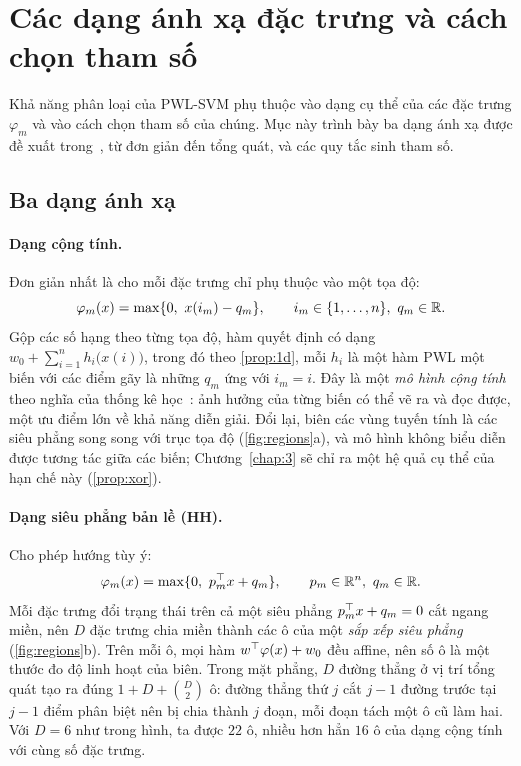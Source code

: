 \section{Các dạng ánh xạ đặc trưng và cách chọn tham số}\label{sec:maps}

Khả năng phân loại của PWL-SVM phụ thuộc vào dạng cụ thể của các đặc trưng $\varphi_m$ và vào cách chọn tham số của chúng. Mục này trình bày ba dạng ánh xạ được đề xuất trong~\cite{huang2013}, từ đơn giản đến tổng quát, và các quy tắc sinh tham số.

\subsection{Ba dạng ánh xạ}

\paragraph{Dạng cộng tính.} Đơn giản nhất là cho mỗi đặc trưng chỉ phụ thuộc vào một tọa độ:
\begin{equation}\label{eq:additive}
\varphi_m(x)=\max\{0,\ x(i_m)-q_m\},\qquad i_m\in\{1,\dots,n\},\ q_m\in\R .
\end{equation}
Gộp các số hạng theo từng tọa độ, hàm quyết định có dạng $w_0+\sum_{i=1}^{n}h_i\bigl(x(i)\bigr)$, trong đó theo \cref{prop:1d}, mỗi $h_i$ là một hàm PWL một biến với các điểm gãy là những $q_m$ ứng với $i_m=i$. Đây là một \emph{mô hình cộng tính} theo nghĩa của thống kê học~\cite{hastie1990}: ảnh hưởng của từng biến có thể vẽ ra và đọc được, một ưu điểm lớn về khả năng diễn giải. Đổi lại, biên các vùng tuyến tính là các siêu phẳng song song với trục tọa độ (\cref{fig:regions}a), và mô hình không biểu diễn được tương tác giữa các biến; Chương~\ref{chap:3} sẽ chỉ ra một hệ quả cụ thể của hạn chế này (\cref{prop:xor}).

\paragraph{Dạng siêu phẳng bản lề (HH).} Cho phép hướng tùy ý:
\begin{equation}\label{eq:hh}
\varphi_m(x)=\max\{0,\ p_m^\top x+q_m\},\qquad p_m\in\mathbb{R}^n,\ q_m\in\mathbb{R} .
\end{equation}
Mỗi đặc trưng đổi trạng thái trên cả một siêu phẳng $p_m^\top x+q_m=0$ cắt ngang miền, nên $D$ đặc trưng chia miền thành các ô của một \emph{sắp xếp siêu phẳng} (\cref{fig:regions}b). Trên mỗi ô, mọi hàm $w^\top\varphi(x)+w_0$ đều affine, nên số ô là một thước đo độ linh hoạt của biên. Trong mặt phẳng, $D$ đường thẳng ở vị trí tổng quát tạo ra đúng $1+D+\binom{D}{2}$ ô: đường thẳng thứ $j$ cắt $j-1$ đường trước tại $j-1$ điểm phân biệt nên bị chia thành $j$ đoạn, mỗi đoạn tách một ô cũ làm hai. Với $D=6$ như trong hình, ta được $22$ ô, nhiều hơn hẳn $16$ ô của dạng cộng tính với cùng số đặc trưng.

